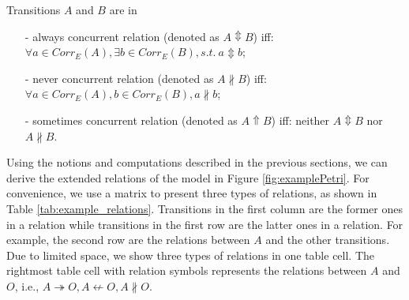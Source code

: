 \documentclass[dvips,...]{llncs}
\begin{document}
\begin{definition}\label{def:concurrentRelations}
Transitions $A$ and $B$ are in
	\begin{itemize}
		\item[-] always concurrent relation (denoted as $A\Updownarrow B$) iff: $\forall a\in Corr_{E}(A),\exists b\in Corr_{E}(B),s.t.~a\Updownarrow b$;
		\item[-] never concurrent relation (denoted as $A\nparallel B$) iff: $\forall a\in Corr_{E}(A),b\in Corr_{E}(B),a\nparallel b$;
		\item[-] sometimes concurrent relation (denoted as $A\Uparrow B$) iff: neither $A\Updownarrow B$ nor $A\nparallel B$.
	\end{itemize}
\end{definition}

\begin{example}\label{ex:examplePetriRelations}
Using the notions and computations described in the previous sections, we can derive the extended relations of the model in Figure \ref{fig:examplePetri}. For convenience, we use a matrix to present three types of relations, as shown in Table \ref{tab:example_relations}. Transitions in the first column are the former ones in a relation while transitions in the first row are the latter ones in a relation. For example, the second row are the relations between $A$ and the other transitions. Due to limited space, we show three types of relations in one table cell. The rightmost table cell with relation symbols represents the relations between $A$ and $O$, i.e., $A\twoheadrightarrow O,A\nleftarrow O,A\nparallel O$.
\end{example}
\end{document}
